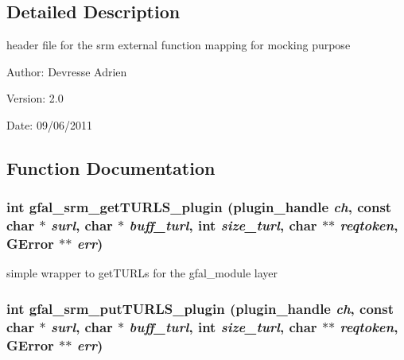 \subsection{Detailed Description}
header file for the srm external function mapping for mocking purpose 

\begin{Desc}
\item[Author:]Devresse Adrien \end{Desc}
\begin{Desc}
\item[Version:]2.0 \end{Desc}
\begin{Desc}
\item[Date:]09/06/2011 \end{Desc}


\subsection{Function Documentation}
\subsubsection{\setlength{\rightskip}{0pt plus 5cm}int gfal\_\-srm\_\-get\-TURLS\_\-plugin (plugin\_\-handle {\em ch}, const char $\ast$ {\em surl}, char $\ast$ {\em buff\_\-turl}, int {\em size\_\-turl}, char $\ast$$\ast$ {\em reqtoken}, GError $\ast$$\ast$ {\em err})}\label{gfal__common__srm__internal__layer_8h_c85b3f997dc3eeb76f153e01e8c037d5}


simple wrapper to get\-TURLs for the gfal\_\-module layer 
\subsubsection{\setlength{\rightskip}{0pt plus 5cm}int gfal\_\-srm\_\-put\-TURLS\_\-plugin (plugin\_\-handle {\em ch}, const char $\ast$ {\em surl}, char $\ast$ {\em buff\_\-turl}, int {\em size\_\-turl}, char $\ast$$\ast$ {\em reqtoken}, GError $\ast$$\ast$ {\em err})}\label{gfal__common__srm__internal__layer_8h_24220c90dc2c2c7b43544c77bfac96cb}


